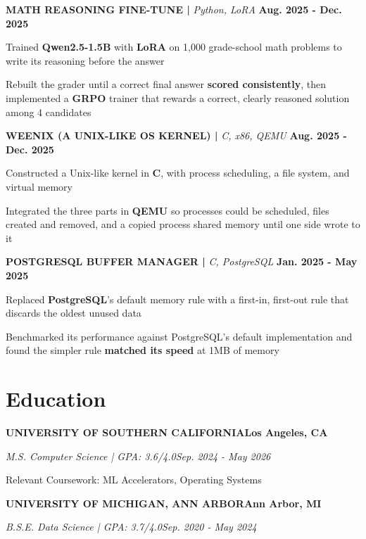 \documentclass[10pt]{article}
\renewcommand{\note}[1]{#1\par}
\newcommand{\school}[4]{%
  \vspace{2pt}%
  \textbf{\MakeUppercase{#1}}\hfill\textbf{#2}\par
  \vspace{0.5pt}%
  \textit{#3}\hfill\textit{#4}\par
}
\newcommand{\proj}[4]{%
  \vspace{3pt}%
  \textbf{\MakeUppercase{#1} | }\textit{#2}\hfill
  \textbf{#4}%
  \notblank{#3}{\ \textbf{| #3}}{}%
  \par
}
\begin{document}
\proj{Math Reasoning Fine-Tune}{Python, LoRA}{USC}{Aug. 2025 - Dec. 2025}
\begin{bullets}
  \item Trained \textbf{Qwen2.5-1.5B} with \textbf{LoRA} on 1,000 grade-school math problems to write its reasoning before the answer
  \item Rebuilt the grader until a correct final answer \textbf{scored consistently}, then implemented a \textbf{GRPO} trainer that rewards a correct, clearly reasoned solution among 4 candidates
\end{bullets}

\proj{Weenix (A Unix-Like OS Kernel)}{C, x86, QEMU}{USC}{Aug. 2025 - Dec. 2025}
\begin{bullets}
  \item Constructed a Unix-like kernel in \textbf{C}, with process scheduling, a file system, and virtual memory
  \item Integrated the three parts in \textbf{QEMU} so processes could be scheduled, files created and removed, and a copied process shared memory until one side wrote to it
\end{bullets}

\proj{PostgreSQL Buffer Manager}{C, PostgreSQL}{USC}{Jan. 2025 - May 2025}
\begin{bullets}
  \item Replaced \textbf{PostgreSQL}'s default memory rule with a first-in, first-out rule that discards the oldest unused data
  \item Benchmarked its performance against PostgreSQL's default implementation and found the simpler rule \textbf{matched its speed} at 1MB of memory
\end{bullets}

\section{Education}
\vspace{-2pt}
\school{University of Southern California}{Los Angeles, CA}{M.S. Computer Science | GPA: 3.6/4.0}{Sep. 2024 - May 2026}
\note{Relevant Coursework: ML Accelerators, Operating Systems}

\school{University of Michigan, Ann Arbor}{Ann Arbor, MI}{B.S.E. Data Science | GPA: 3.7/4.0}{Sep. 2020 - May 2024}
\end{document}
